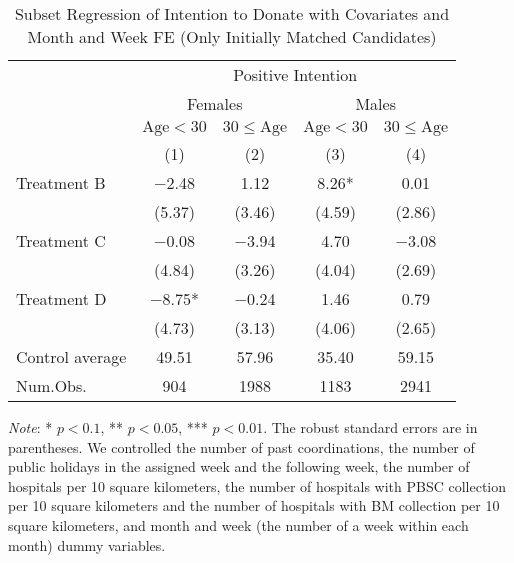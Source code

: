 \documentclass[12pt, a4paper]{article}
\begin{document}
\begin{table}[H]

\caption{\label{tab:lm-positive-subset2-init}Subset Regression of Intention to Donate with Covariates and Month and Week FE (Only Initially Matched Candidates)}
\centering
\fontsize{8}{10}\selectfont
\begin{threeparttable}
\begin{tabular}[t]{lcccc}
\toprule
\multicolumn{1}{c}{ } & \multicolumn{4}{c}{Positive Intention} \\
\cmidrule(l{3pt}r{3pt}){2-5}
\multicolumn{1}{c}{ } & \multicolumn{2}{c}{Females} & \multicolumn{2}{c}{Males} \\
\cmidrule(l{3pt}r{3pt}){2-3} \cmidrule(l{3pt}r{3pt}){4-5}
\multicolumn{1}{c}{ } & \multicolumn{1}{c}{$\text{Age} < 30$} & \multicolumn{1}{c}{$30 \le \text{Age}$} & \multicolumn{1}{c}{$\text{Age} < 30$} & \multicolumn{1}{c}{$30 \le \text{Age}$} \\
\cmidrule(l{3pt}r{3pt}){2-2} \cmidrule(l{3pt}r{3pt}){3-3} \cmidrule(l{3pt}r{3pt}){4-4} \cmidrule(l{3pt}r{3pt}){5-5}
  & (1) & (2) & (3) & (4)\\
\midrule
Treatment B & \num{-2.48} & \num{1.12} & \num{8.26}* & \num{0.01}\\
 & (\num{5.37}) & (\num{3.46}) & (\num{4.59}) & (\num{2.86})\\
Treatment C & \num{-0.08} & \num{-3.94} & \num{4.70} & \num{-3.08}\\
 & (\num{4.84}) & (\num{3.26}) & (\num{4.04}) & (\num{2.69})\\
Treatment D & \num{-8.75}* & \num{-0.24} & \num{1.46} & \num{0.79}\\
 & (\num{4.73}) & (\num{3.13}) & (\num{4.06}) & (\num{2.65})\\
\midrule
Control average & 49.51 & 57.96 & 35.40 & 59.15\\
Num.Obs. & \num{904} & \num{1988} & \num{1183} & \num{2941}\\
\bottomrule
\end{tabular}
\begin{tablenotes}
\item \emph{Note}: * $p < 0.1$, ** $p < 0.05$, *** $p < 0.01$. The robust standard errors are in parentheses. We controlled the number of past coordinations, the number of public holidays in the assigned week and the following week, the number of hospitals per 10 square kilometers, the number of hospitals with PBSC collection per 10 square kilometers and the number of hospitals with BM collection per 10 square kilometers, and month and week (the number of a week within each month) dummy variables.
\end{tablenotes}
\end{threeparttable}
\end{table}
\end{document}
